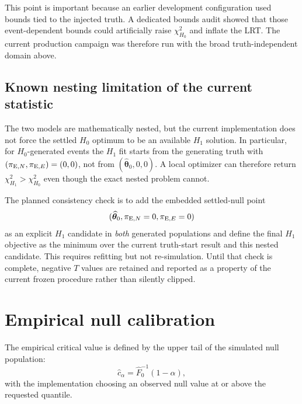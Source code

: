 \documentclass[11pt,a4paper]{article}
\newcommand{\pen}{\pi_{{\rm E},N}}
\newcommand{\pee}{\pi_{{\rm E},E}}
\newcommand{\Hnull}{H_0}
\newcommand{\Halt}{H_1}
\begin{document}
This point is important because an earlier development configuration used bounds tied to the
injected truth.  A dedicated bounds audit showed that those event-dependent bounds could
artificially raise $\chi^2_{\Hnull}$ and inflate the LRT.  The current production campaign was
therefore run with the broad truth-independent domain above.

\subsection{Known nesting limitation of the current statistic}

The two models are mathematically nested, but the current implementation does not force the
settled $\Hnull$ optimum to be an available $\Halt$ solution.  In particular, for
$\Hnull$-generated events the $\Halt$ fit starts from the generating truth with
$(\pen,\pee)=(0,0)$, not from $(\widehat{\bm\theta}_{0},0,0)$.  A local optimizer can therefore
return $\chi^2_{\Halt}>\chi^2_{\Hnull}$ even though the exact nested problem cannot.

The planned consistency check is to add the embedded settled-null point
\begin{equation}
    (\widehat{\bm\theta}_{0},\pen=0,\pee=0)
\end{equation}
as an explicit $\Halt$ candidate in \emph{both} generated populations and define the final
$\Halt$ objective as the minimum over the current truth-start result and this nested candidate.
This requires refitting but not re-simulation.  Until that check is complete, negative $T$
values are retained and reported as a property of the current frozen procedure rather than
silently clipped.
\section{Empirical null calibration}

The empirical critical value is defined by the upper tail of the simulated null population:
\begin{equation}
    \widehat c_\alpha
    =
    \widehat F_0^{-1}(1-\alpha),
\end{equation}
with the implementation choosing an observed null value at or above the requested quantile.
\end{document}
